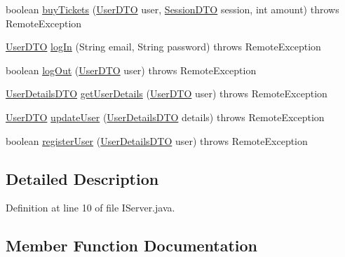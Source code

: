 \begin{DoxyCompactItemize}
\item 
boolean \mbox{\hyperlink{interfacees_1_1deusto_1_1server_1_1_i_server_ac3302c01fefc37a32c0bcbf79fcce44b}{buy\+Tickets}} (\mbox{\hyperlink{classes_1_1deusto_1_1server_1_1data_1_1_user_d_t_o}{User\+D\+TO}} user, \mbox{\hyperlink{classes_1_1deusto_1_1server_1_1data_1_1_session_d_t_o}{Session\+D\+TO}} session, int amount)  throws Remote\+Exception
\item 
\mbox{\hyperlink{classes_1_1deusto_1_1server_1_1data_1_1_user_d_t_o}{User\+D\+TO}} \mbox{\hyperlink{interfacees_1_1deusto_1_1server_1_1_i_server_a62db155ac744b9712e303ceea76a3560}{log\+In}} (String email, String password)  throws Remote\+Exception
\item 
boolean \mbox{\hyperlink{interfacees_1_1deusto_1_1server_1_1_i_server_a479231082cae13f9c651c0ec2cb2cece}{log\+Out}} (\mbox{\hyperlink{classes_1_1deusto_1_1server_1_1data_1_1_user_d_t_o}{User\+D\+TO}} user)  throws Remote\+Exception
\item 
\mbox{\hyperlink{classes_1_1deusto_1_1server_1_1data_1_1_user_details_d_t_o}{User\+Details\+D\+TO}} \mbox{\hyperlink{interfacees_1_1deusto_1_1server_1_1_i_server_a2dcd7f0b0e157eb797e20432c0b0e971}{get\+User\+Details}} (\mbox{\hyperlink{classes_1_1deusto_1_1server_1_1data_1_1_user_d_t_o}{User\+D\+TO}} user)  throws Remote\+Exception
\item 
\mbox{\hyperlink{classes_1_1deusto_1_1server_1_1data_1_1_user_d_t_o}{User\+D\+TO}} \mbox{\hyperlink{interfacees_1_1deusto_1_1server_1_1_i_server_aff376200af975b145ac85ccfdf48a229}{update\+User}} (\mbox{\hyperlink{classes_1_1deusto_1_1server_1_1data_1_1_user_details_d_t_o}{User\+Details\+D\+TO}} details)  throws Remote\+Exception
\item 
boolean \mbox{\hyperlink{interfacees_1_1deusto_1_1server_1_1_i_server_a998e20655e760b135fab601a417aa5ae}{register\+User}} (\mbox{\hyperlink{classes_1_1deusto_1_1server_1_1data_1_1_user_details_d_t_o}{User\+Details\+D\+TO}} user)  throws Remote\+Exception
\end{DoxyCompactItemize}


\subsection{Detailed Description}


Definition at line 10 of file I\+Server.\+java.



\subsection{Member Function Documentation}
\mbox{\label{interfacees_1_1deusto_1_1server_1_1_i_server_a393d8689e14b3534dfa425e4c900532e}} 
